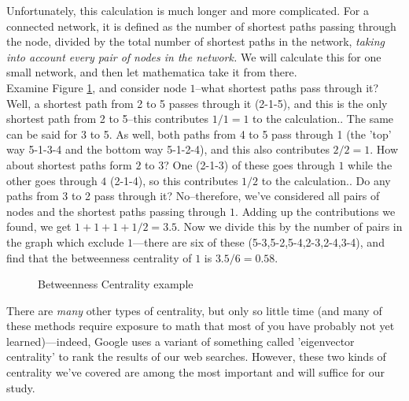 \documentclass[12pt]{article}
\begin{document}
Unfortunately, this calculation is much longer and more complicated. For a connected network, it is defined as the number of shortest paths passing through the node, divided by the total number of shortest paths in the network, \emph{taking into account every pair of nodes in the network.} We will calculate this for one small network, and then let mathematica take it from there. \\
Examine Figure \ref{bw}, and consider node $1$--what shortest paths pass through it? Well, a shortest path from 2 to 5 passes through it (2-1-5), and this is the only shortest path from 2 to 5--this contributes $1/1=1$ to the calculation.. The same can be said for 3 to 5. As well, both paths from 4 to 5 pass through 1 (the 'top' way 5-1-3-4 and the bottom way 5-1-2-4), and this also contributes $2/2=1$. How about shortest paths form $2$ to $3$? One (2-1-3) of these goes through $1$ while the other goes through $4$ (2-1-4), so this contributes $1/2$ to the calculation.. Do any paths from 3 to 2 pass through it? No--therefore, we've considered all pairs of nodes and the shortest paths passing through $1.$ Adding up the contributions we found, we get $1+1+1+1/2=3.5$. Now we divide this by the number of pairs in the graph which exclude $1$---there are six of these (5-3,5-2,5-4,2-3,2-4,3-4), and find that the betweenness centrality of $1$ is $3.5/6=0.58$.
\begin{figure}[htbp]
\begin{center}
\label{bw}
\caption{Betweenness Centrality example}
\end{center}
\end{figure}
There are \emph{many} other types of centrality, but only so little time (and many of these methods require exposure to math that most of you have probably not yet learned)---indeed, Google uses a variant of something called 'eigenvector centrality' to rank the results of our web searches. However, these two kinds of centrality we've covered are among the most important and will suffice for our study.
\end{document}
